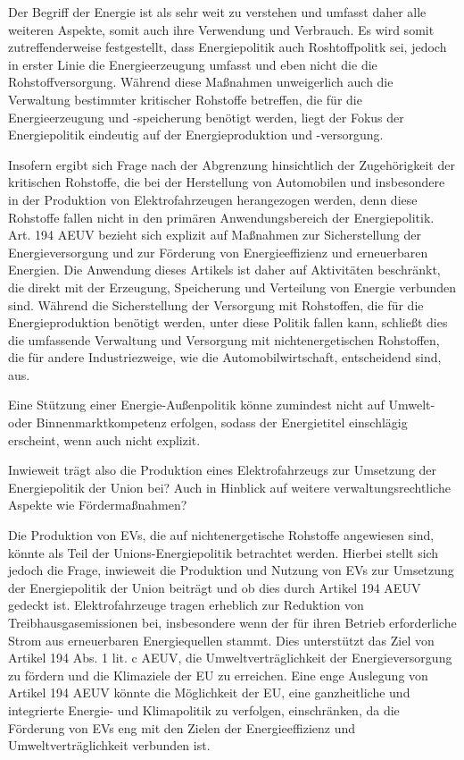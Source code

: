 \documentclass[12pt,a4paper,oneside]{book} %
\begin{document}
Der Begriff der Energie ist als sehr weit zu verstehen und umfasst daher alle weiteren Aspekte, somit auch ihre Verwendung und Verbrauch.\autocite[Hamer Art. 194 Rn 8]{von_der_groeben_europaisches_2024} 
Es wird somit zutreffenderweise festgestellt, dass Energiepolitik auch Roshtoffpolitk sei, jedoch in erster Linie die Energieerzeugung umfasst und eben nicht die die Rohstoffversorgung. Während diese Maßnahmen unweigerlich auch die Verwaltung bestimmter kritischer Rohstoffe betreffen, die für die Energieerzeugung und -speicherung benötigt werden, liegt der Fokus der Energiepolitik eindeutig auf der Energieproduktion und -versorgung.

Insofern ergibt sich Frage nach der Abgrenzung hinsichtlich der Zugehörigkeit der kritischen Rohstoffe, die bei der Herstellung von Automobilen und insbesondere in der Produktion von Elektrofahrzeugen herangezogen werden, denn diese Rohstoffe fallen nicht in den primären Anwendungsbereich der Energiepolitik. Art. 194 AEUV bezieht sich explizit auf Maßnahmen zur Sicherstellung der Energieversorgung und zur Förderung von Energieeffizienz und erneuerbaren Energien. Die Anwendung dieses Artikels ist daher auf Aktivitäten beschränkt, die direkt mit der Erzeugung, Speicherung und Verteilung von Energie verbunden sind. Während die Sicherstellung der Versorgung mit Rohstoffen, die für die Energieproduktion benötigt werden, unter diese Politik fallen kann, schließt dies die umfassende Verwaltung und Versorgung mit nichtenergetischen Rohstoffen, die für andere Industriezweige, wie die Automobilwirtschaft, entscheidend sind, aus.
	
Eine Stützung einer Energie-Außenpolitik könne zumindest nicht auf Umwelt- oder Binnenmarktkompetenz erfolgen, sodass der Energietitel einschlägig erscheint, wenn auch nicht explizit.\autocite{Gundel, Theobald/Kühling, Europäisches Energierecht, V. Rn. 87}
	
Inwieweit trägt also die Produktion eines Elektrofahrzeugs zur Umsetzung der Energiepolitik der Union bei? Auch in Hinblick auf weitere verwaltungsrechtliche Aspekte wie Fördermaßnahmen?

Die Produktion von EVs, die auf nichtenergetische Rohstoffe angewiesen sind, könnte als Teil der Unions-Energiepolitik betrachtet werden. Hierbei stellt sich jedoch die Frage, inwieweit die Produktion und Nutzung von EVs zur Umsetzung der Energiepolitik der Union beiträgt und ob dies durch Artikel 194 AEUV gedeckt ist. Elektrofahrzeuge tragen erheblich zur Reduktion von Treibhausgasemissionen bei, insbesondere wenn der für ihren Betrieb erforderliche Strom aus erneuerbaren Energiequellen stammt. Dies unterstützt das Ziel von Artikel 194 Abs. 1 lit. c AEUV, die Umweltverträglichkeit der Energieversorgung zu fördern und die Klimaziele der EU zu erreichen. Eine enge Auslegung von Artikel 194 AEUV könnte die Möglichkeit der EU, eine ganzheitliche und integrierte Energie- und Klimapolitik zu verfolgen, einschränken, da die Förderung von EVs eng mit den Zielen der Energieeffizienz und Umweltverträglichkeit verbunden ist.
\end{document}
